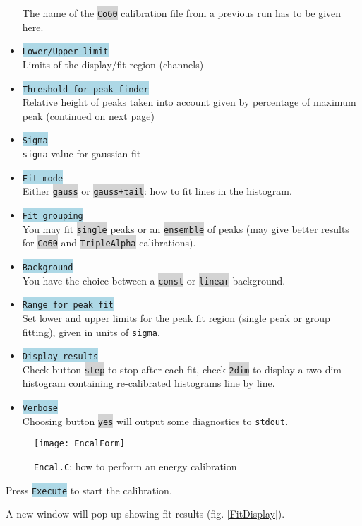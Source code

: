 \documentclass[10pt]{article}
\newcommand{\blue}[1]{\colorbox{lightblue}{\texttt{#1}}}
\newcommand{\gray}[1]{\colorbox{lightgray}{\texttt{#1}}}
\begin{document}
\begin{center}
\begin{itemize}
	The name of the \gray{Co60} calibration file from a previous run has to be given here.
\item	\blue{Lower/Upper limit}\\
	Limits of the display/fit region (channels)
\item	\blue{Threshold for peak finder}\\
	Relative height of peaks taken into account given by percentage of maximum peak
	\hfill(continued on next page)
\newpage
\item	\blue{Sigma}\\
	\texttt{sigma} value for gaussian fit
\item	\blue{Fit mode}\\
	Either \gray{gauss} or \gray{gauss+tail}: how to fit lines in the histogram.
\item	\blue{Fit grouping}\\
	You may fit \gray{single} peaks  or an \gray{ensemble} of peaks (may give better results for \gray{Co60}
	and \gray{TripleAlpha} calibrations).
\item	\blue{Background}\\
	You have the choice between a \gray{const} or \gray{linear} background.
\item	\blue{Range for peak fit}\\
	Set lower and upper limits for the peak fit region (single peak  or group fitting), given in units of \texttt{sigma}.
\item	\blue{Display results}\\
	Check button \gray{step} to stop after each fit, check \gray{2dim} to display a two-dim histogram containing re-calibrated
	histograms line by line.
\item	\blue{Verbose}\\
	Choosing button \gray{yes} will output some diagnostics to \texttt{stdout}.
\end{itemize}
\newpage
\end{center}
\begin{figure}[H]
\centerline{\texttt{[image: EncalForm]}}
\caption{\texttt{Encal.C}: how to perform an energy calibration}
\label{EncalForm}
\end{figure}
\newpage
Press \blue{Execute} to start the calibration.\vspace{.5cm}

A new window will pop up showing fit results (fig. \ref{FitDisplay}).\vspace{.5cm}
\end{document}
